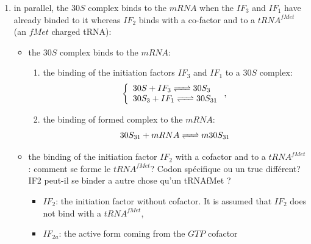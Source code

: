 \begin{enumerate}
  \item in parallel, the $30S$ complex binds to the $mRNA$ when the $IF_3$ and $IF_1$ have already binded to it whereas $IF_2$ binds with a co-factor and to a $tRNA^{fMet}$ (an $fMet$ charged tRNA):
    \begin{itemize}
    \item the $30S$ complex binds to the $mRNA$:
      \begin{enumerate}
      \item the binding of the initiation factors $IF_3$ and $IF_1$ to a $30S$ complex:
        $$
        \left\{
          \begin{array}{l}
          \reactionRev{30S+IF_3}{30S_3}{}{} \\
          \reactionRev{30S_3+IF_1}{30S_{31}}{}{} \\
          \end{array}
        \right.                                                                                                                                                 ,
        $$
      \item the binding of formed complex to the $mRNA$:
        $$
        \reactionRev{30S_{31}+mRNA}{m30S_{31}}{}{}{}
        $$
      \end{enumerate}
    \item the binding of the initiation factor $IF_2$ with a cofactor and to a $tRNA^{fMet}$: \textcolor[rgb]{1.00,0.00,0.00}{comment se forme le $tRNA^{fMet}$? Codon spécifique ou un truc différent? IF2 peut-il se binder a autre chose qu'un tRNAfMet ?}
      \begin{itemize}
      \item $IF_2$: the initiation factor without cofactor. It is assumed that $IF_2$ does not bind with a $tRNA^{fMet}$,
      \item $IF_{2a}$: the active form coming from the $GTP$ cofactor

\end{itemize}
\end{itemize}
\end{enumerate}
